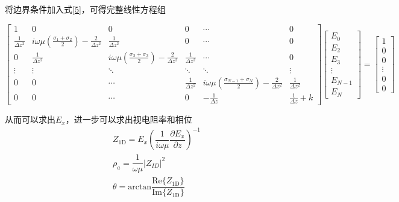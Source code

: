 \documentclass[12pt]{ctexart}
\begin{document}
    将边界条件加入式\eqref{5}，可得完整线性方程组
    \begin{formal}
        \begin{equation*}
            \begin{bmatrix}
                1 & 0 & 0 & 0 & \cdots & 0 \\
                \frac{1}{\Delta z^2} & i\omega\mu\left(\frac{\sigma_{1}+\sigma_2}{2}\right)-\frac{2}{\Delta z^2} & \frac{1}{\Delta z^2} & 0 & \cdots & 0 \\
                0 & \frac{1}{\Delta z^2} & i\omega\mu\left(\frac{\sigma_{2}+\sigma_3}{2}\right)-\frac{2}{\Delta z^2} & \frac{1}{\Delta z^2} & \cdots & 0 \\
                \vdots & \vdots & \ddots & \ddots & \ddots & \vdots \\
                0 & 0 & \cdots & \frac{1}{\Delta z^2} & i\omega\mu\left(\frac{\sigma_{N-1}+\sigma_N}{2}\right)-\frac{2}{\Delta z^2} & \frac{1}{\Delta z^2}\\
                0 & 0 & \cdots & 0 & -\frac{1}{\Delta z} & \frac{1}{\Delta z}+k
            \end{bmatrix}
            \begin{bmatrix}
                E_0 \\
                E_2 \\
                E_3 \\
                \vdots \\
                E_{N-1} \\
                E_N
            \end{bmatrix}=
            \begin{bmatrix}
                1 \\
                0 \\
                0 \\
                \vdots \\
                0 \\
                0
            \end{bmatrix}
        \end{equation*}
    \end{formal}
    
    从而可以求出$E_x$，进一步可以求出视电阻率和相位
    \begin{subequations}
        \begin{gather}
            Z_{\text{1D}}=E_x\left(\dfrac{1}{i\omega\mu}\dfrac{\partial E_x}{\partial z}\right)^{-1}\label{8a}\\
            \rho_a=\dfrac{1}{\omega \mu}|Z_{ID}|^2\label{8b}\\
            \theta = \mathrm{arctan}\dfrac{\mathrm{Re}\{Z_{\text{1D}}\}}{\mathrm{Im}\{Z_{\text{1D}}\}}\label{8c}
        \end{gather}
    \end{subequations}
\end{document}
